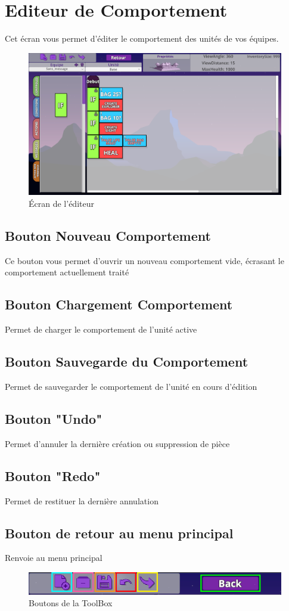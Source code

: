 \documentclass{report}
\begin{document}
\section{Editeur de Comportement}
Cet écran vous permet d’éditer le comportement des unités de vos équipes.
\begin{figure}[!h]
	\centering
		\includegraphics[scale=0.35]{Ecran_Editeur}
	\caption{Écran de l'éditeur}
\end{figure}

\subsection{Bouton Nouveau Comportement}
Ce bouton vous permet d’ouvrir un nouveau comportement vide, écrasant le comportement actuellement traité
\subsection{Bouton Chargement Comportement}
Permet de charger le comportement de l’unité active
\subsection{Bouton Sauvegarde du Comportement}
Permet de sauvegarder le comportement de l’unité en cours d’édition
\subsection{Bouton "Undo"}
Permet d’annuler la dernière création ou suppression de pièce
\subsection{Bouton "Redo"}
Permet de restituer la dernière annulation
\subsection{Bouton de retour au menu principal}
Renvoie au menu principal
\begin{figure}[!h]
	\centering
		\includegraphics[scale=0.80]{ToolBoxSelectedArea}
	\caption{Boutons de la ToolBox}
\end{figure}
\end{document}
